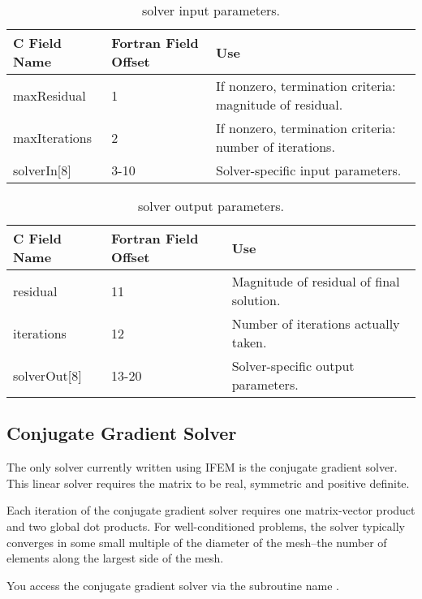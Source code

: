 \documentclass[10pt]{article}
\begin{document}
\begin{table}[hh]
\begin{center}
\begin{tabular}{|l|l|l|}\hline
C Field Name & Fortran Field Offset & Use\\\hline
maxResidual & 1 & If nonzero, termination criteria: magnitude of residual. \\
maxIterations & 2 & If nonzero, termination criteria: number of iterations. \\
solverIn[8] & 3-10 & Solver-specific input parameters. \\
\hline
\end{tabular}
\end{center}
\caption{ solver input parameters.}
\label{table:solverIn}
\end{table}

\begin{table}[hh]
\begin{center}
\begin{tabular}{|l|l|l|}\hline
C Field Name & Fortran Field Offset & Use\\\hline
residual & 11 & Magnitude of residual of final solution. \\
iterations & 12 & Number of iterations actually taken. \\
solverOut[8] & 13-20 & Solver-specific output parameters. \\
\hline
\end{tabular}
\end{center}
\caption{ solver output parameters.}
\label{table:solverOut}
\end{table}


\subsection{Conjugate Gradient Solver}

The only solver currently written using IFEM is the conjugate gradient solver.
This linear solver requires the matrix to be real, symmetric and positive definite.

Each iteration of the conjugate gradient solver requires one matrix-vector product
and two global dot products.  For well-conditioned problems, the solver typically 
converges in some small multiple of the diameter of the mesh--the number of elements
along the largest side of the mesh.

You access the conjugate gradient solver via the subroutine name .
\end{document}
